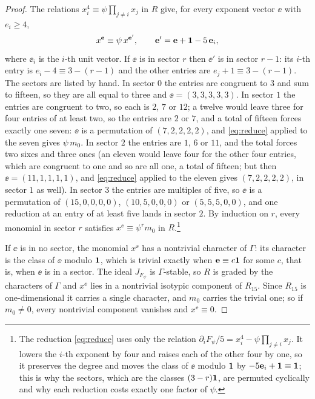 \begin{proof}
The relations $x_i^4\equiv\psi\prod_{j\ne i}x_j$ in $R$ give, for every
exponent vector $\ee$ with $e_i\ge4$,
\begin{equation}\label{eq:reduce}
x^{\mathbf{e}}\equiv\psi\,x^{\mathbf{e}'},\qquad \mathbf{e}'=\mathbf{e}+\mathbf{1}-5\,\mathbf{e}_i,
\end{equation}
where $\ee_i$ is the $i$-th unit vector. If $\ee$ is in sector $r$ then
$\ee'$ is in sector $r-1$: its $i$-th entry is $e_i-4\equiv 3-(r-1)$ and the
other entries are $e_j+1\equiv3-(r-1)$. The sectors are listed by hand. In
sector $0$ the entries are congruent to $3$ and sum to fifteen, so they are
all equal to three and $\ee=(3,3,3,3,3)$. In sector $1$ the entries are congruent to
two, so each is $2$, $7$ or $12$; a twelve would leave three for four
entries of at least two, so the entries are $2$ or $7$, and a total of
fifteen forces exactly one seven: $\ee$ is a
permutation of $(7,2,2,2,2)$, and \eqref{eq:reduce} applied to the seven
gives $\psi\,m_0$. In sector $2$ the entries are $1$, $6$ or $11$, and the
total forces two sixes and three ones (an eleven would leave four for the
other four entries, which are congruent to one and so are all one, a total
of fifteen; but then $\ee=(11,1,1,1,1)$, and \eqref{eq:reduce} applied to
the eleven gives $(7,2,2,2,2)$, in sector $1$ as well). In sector $3$ the
entries are multiples of five, so $\ee$ is a permutation of $(15,0,0,0,0)$,
$(10,5,0,0,0)$ or $(5,5,5,0,0)$, and one reduction at an entry of at least
five lands in sector $2$. By induction on $r$, every monomial in sector $r$
satisfies $x^{\ee}\equiv\psi^rm_0$ in $R$.\footnote{The reduction
\eqref{eq:reduce} uses only the relation $\partial_iF_\psi/5=x_i^4-\psi
\prod_{j\ne i}x_j$. It lowers the $i$-th exponent by four and raises each of
the other four by one, so it preserves the degree and moves the class of
$\ee$ modulo $\mathbf{1}$ by $-5\mathbf{e}_i+\mathbf{1}\equiv\mathbf{1}$; this is why the sectors,
which are the classes $(3-r)\mathbf{1}$, are permuted cyclically and why each
reduction costs exactly one factor of $\psi$.}

If $\ee$ is in no sector, the monomial $x^{\ee}$ has a nontrivial character
of $\Gamma$: its character is the class of $\ee$ modulo $\mathbf{1}$, which is
trivial exactly when $\mathbf{e}\equiv c\mathbf{1}$ for some $c$, that is, when $\ee$ is
in a sector. The ideal $J_{F_\psi}$ is $\Gamma$-stable, so $R$ is graded by
the characters of $\Gamma$ and $x^{\ee}$ lies in a nontrivial isotypic
component of $R_{15}$. Since $R_{15}$ is one-dimensional it carries a single
character, and $m_0$ carries the trivial one; so if $m_0\ne0$, every
nontrivial component vanishes and $x^{\ee}\equiv0$.


\end{proof}
